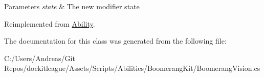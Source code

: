 \begin{DoxyParams}{Parameters}
{\em state} & The new modifier state\\
\hline
\end{DoxyParams}


Reimplemented from \hyperlink{class_ability_a18f5361c45dc334b541892880382c098}{Ability}.



The documentation for this class was generated from the following file\+:\begin{DoxyCompactItemize}
\item 
C\+:/\+Users/\+Andreas/\+Git Repos/dockitleague/\+Assets/\+Scripts/\+Abilities/\+Boomerang\+Kit/Boomerang\+Vision.\+cs\end{DoxyCompactItemize}
